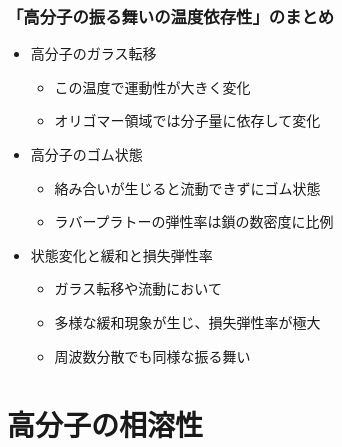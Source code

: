 \documentclass[12pt, dvipdfmx]{beamer}
\begin{document}
\begin{frame}
	\frametitle{「高分子の振る舞いの温度依存性」のまとめ}
        \begin{boxnote}
            \vspace{-3mm}
            \begin{itemize}
                \item 高分子のガラス転移
                    \begin{itemize}
                        \item この温度で運動性が大きく変化
                        \item オリゴマー領域では分子量に依存して変化
                    \end{itemize} 
                \item 高分子のゴム状態
                    \begin{itemize}
                        \item 絡み合いが生じると流動できずにゴム状態
                        \item ラバープラトーの弾性率は鎖の数密度に比例
                    \end{itemize} 
                \item 状態変化と緩和と損失弾性率
                    \begin{itemize}
                        \item ガラス転移や流動において
                        \item 多様な緩和現象が生じ、損失弾性率が極大
                        \item 周波数分散でも同様な振る舞い
                    \end{itemize}
            \end{itemize}
        \end{boxnote}
\end{frame}

\section{高分子の相溶性}
\end{document}
